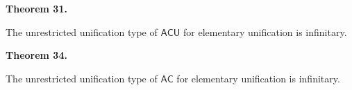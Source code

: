 \documentclass[10pt,a4paper]{amsart}
\begin{document}
 

 
\par\medskip\noindent\textbf{Theorem 31.}\par
 
 
The unrestricted unification type of $\mathsf{ACU}$ for elementary unification is infinitary.\par
 
 

 
\par\medskip\noindent\textbf{Theorem 34.}\par
 
 
The unrestricted unification type of $\mathsf{AC}$ for elementary unification is infinitary.\par
 
 
\end{document}
